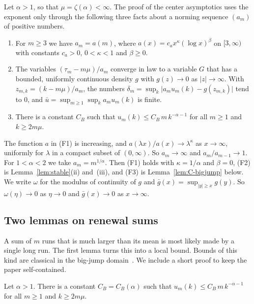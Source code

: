 Let $\alpha>1$, so that $\mu=\zeta(\alpha)<\infty$. The proof of the center asymptotics uses
the exponent only through the following three facts about a norming sequence $(a_m)$ of
positive numbers.
\begin{enumerate}[(F1)]
\item For $m\ge3$ we have $a_m=a(m)$, where $a(x)=c_ax^{\kappa}(\log x)^{\beta}$ on
$[3,\infty)$ with constants $c_a>0$, $0<\kappa<1$ and $\beta\ge0$.
\item The variables $(\tau_m-m\mu)/a_m$ converge in law to a variable $G$ that has a
bounded, uniformly continuous density $g$ with $g(z)\to0$ as $\lvert z\rvert\to\infty$.
With $z_{m,k}=(k-m\mu)/a_m$, the numbers
$\delta_m=\sup_k\lvert a_mu_m(k)-g(z_{m,k})\rvert$ tend to $0$, and
$\bar u=\sup_{m\ge1}\sup_ka_mu_m(k)$ is finite.
\item There is a constant $C_B$ such that $u_m(k)\le C_B\,m\,k^{-\alpha-1}$ for all
$m\ge1$ and $k\ge2m\mu$.
\end{enumerate}
The function $a$ in (F1) is increasing, and $a(\lambda x)/a(x)\to\lambda^\kappa$ as
$x\to\infty$, uniformly for $\lambda$ in a compact subset of $(0,\infty)$. So
$a_m\to\infty$ and $a_m/a_{m-1}\to1$. For $1<\alpha<2$ we take $a_m=m^{1/\alpha}$. Then
(F1) holds with $\kappa=1/\alpha$ and $\beta=0$, (F2) is Lemma~\ref{lem:stable}(ii)
and~(iii), and (F3) is Lemma~\ref{lem:C-bigjump} below. We write $\omega$ for the modulus
of continuity of $g$ and $\bar g(x)=\sup_{\lvert y\rvert\ge x}g(y)$. So
$\omega(\eta)\to0$ as $\eta\to0$ and $\bar g(x)\to0$ as $x\to\infty$.

\subsection{Two lemmas on renewal sums}

A sum of $m$ runs that is much larger than its mean is most likely made by a single long
run. The first lemma turns this into a local bound. Bounds of this kind are
classical in the big-jump domain~\cite{dds2008}. We include a short
proof to keep the paper self-contained.

\begin{lemma}\label{lem:C-bigjump}
Let $\alpha>1$. There is a constant $C_B=C_B(\alpha)$ such that
$u_m(k)\le C_B\,m\,k^{-\alpha-1}$ for all $m\ge1$ and $k\ge2m\mu$.
\end{lemma}

